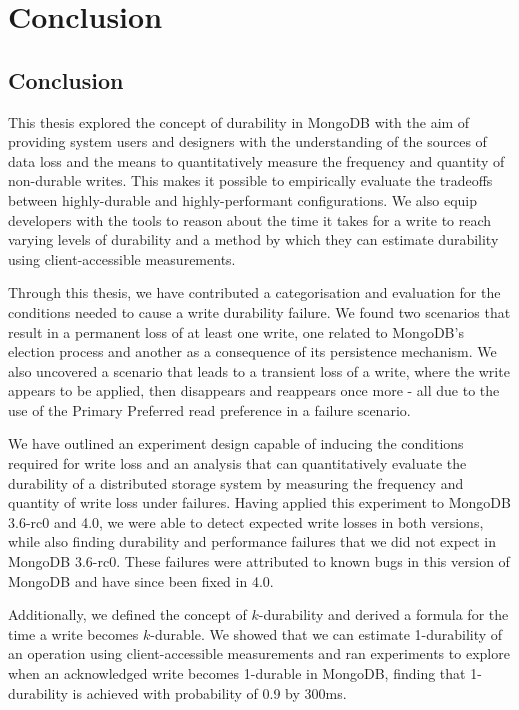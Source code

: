 \part{Conclusion} \label{p:conc}
\chapter{Conclusion} \label{chap:conclusion}

This thesis explored the concept of durability in MongoDB with the aim of providing system users and designers with the understanding of the sources of data loss and the means to quantitatively measure the frequency and quantity of non-durable writes. This makes it possible to empirically evaluate the tradeoffs between highly-durable and highly-performant configurations. We also equip developers with the tools to reason about the time it takes for a write to reach varying levels of durability and a method by which they can estimate durability using client-accessible measurements.

Through this thesis, we have contributed a categorisation and evaluation for the conditions needed to cause a write durability failure. We found two scenarios that result in a permanent loss of at least one write, one related to MongoDB's election process and another as a consequence of its persistence mechanism. We also uncovered a scenario that leads to a transient loss of a write, where the write appears to be applied, then disappears and reappears once more - all due to the use of the Primary Preferred read preference in a failure scenario.

We have outlined an experiment design capable of inducing the conditions required for write loss and an analysis that can quantitatively evaluate the durability of a distributed storage system by measuring the frequency and quantity of write loss under failures. Having applied this experiment to MongoDB 3.6-rc0 and 4.0, we were able to detect expected write losses in both versions, while also finding durability and performance failures that we did not expect in MongoDB 3.6-rc0. These failures were attributed to known bugs in this version of MongoDB and have since been fixed in 4.0.

Additionally, we defined the concept of $k$-durability and derived a formula for the time a write becomes $k$-durable. We showed that we can estimate 1-durability of an operation using client-accessible measurements and ran experiments to explore when an acknowledged write becomes 1-durable in MongoDB, finding that 1-durability is achieved with probability of 0.9 by 300ms.

